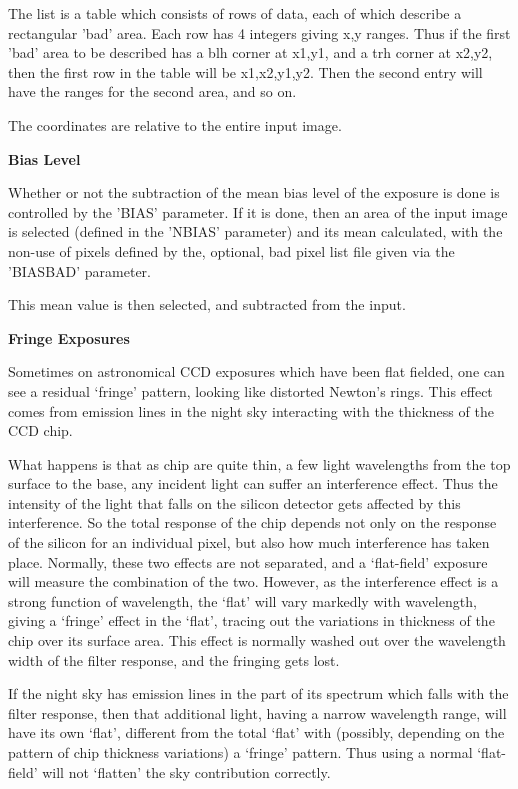 \begin{small}
{{  The list is a table which consists of rows of data, each of
  which describe a rectangular 'bad' area. Each row has 4 integers
  giving x,y ranges. Thus if the first 'bad' area to be described has a
  blh corner at x1,y1, and a trh corner at x2,y2, then the first row
  in the table will be x1,x2,y1,y2. Then the second entry will have
  the ranges for the second area, and so on.

  The coordinates are relative to the entire input image.

{\hspace*{4ex} \bf  Bias Level}

  Whether or not the subtraction of the mean bias level of the exposure
  is done is controlled by the 'BIAS' parameter. If it is done, then an
  area of the input image is selected (defined in the 'NBIAS'
  parameter) and its mean calculated, with the non-use of pixels
  defined by the, optional, bad pixel list file given via the
  'BIASBAD' parameter.

  This mean value is then selected, and subtracted from the input.

{\hspace*{4ex} \bf  Fringe Exposures}

 Sometimes on astronomical CCD exposures which have been flat fielded,
 one can see a residual `fringe' pattern, looking like distorted
 Newton's rings. This effect comes from emission lines in the night
 sky interacting with the thickness of the CCD chip.

 What happens is that as chip are quite thin, a few light wavelengths
 from the top surface to the base, any incident light can suffer an
 interference effect. Thus the intensity of the light that falls on
 the silicon detector gets affected by this interference. So the total
 response of the chip depends not only on the response of the silicon
 for an individual pixel, but also how much interference has taken
 place. Normally, these two effects are not separated, and a `flat-field'
 exposure will measure the combination of the two. However, as the
 interference effect is a strong function of wavelength, the `flat'
 will vary markedly with wavelength, giving a `fringe' effect in the
 `flat', tracing out the variations in thickness of the chip over its
 surface area. This effect is normally washed out over the wavelength
 width of the filter response, and the fringing gets lost.

 If the night sky has emission lines in the part of its spectrum which
 falls with the filter response, then that additional light, having
 a narrow wavelength range, will have its own `flat', different from
 the total `flat' with (possibly, depending on the pattern of chip
 thickness variations) a `fringe' pattern. Thus using a normal
 `flat-field' will not `flatten' the sky contribution correctly.

}}
\end{small}
